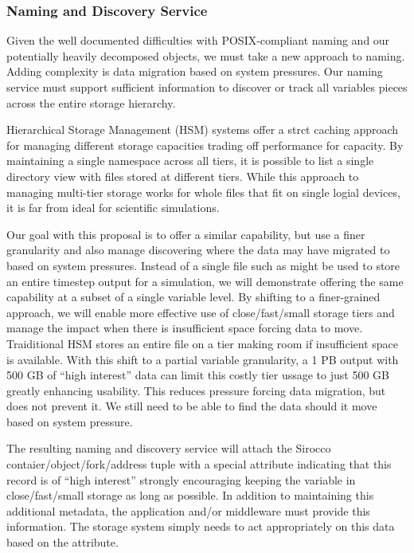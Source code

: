\subsubsection{Naming and Discovery Service}

Given the well documented difficulties with POSIX-compliant naming and our
potentially heavily decomposed objects, we must take a new approach to naming.
Adding complexity is data migration based on system pressures. Our naming
service must support sufficient information to discover or track all variables
pieces across the entire storage hierarchy.

Hierarchical Storage Management (HSM) systems offer a strct caching approach
for managing different storage capacities trading off performance for capacity.
By maintaining a single namespace across all tiers, it is possible to list a
single directory view with files stored at different tiers. While this approach
to managing multi-tier storage works for whole files that fit on single logial
devices, it is far from ideal for scientific simulations.

Our goal with this proposal is to offer a similar capability, but use a finer
granularity and also manage discovering where the data may have migrated to
based on system pressures. Instead of a single file such as might be used to
store an entire timestep output for a simulation, we will demonstrate offering
the same capability at a subset of a single variable level. By shifting to a
finer-grained approach, we will enable more effective use of close/fast/small
storage tiers and manage the impact when there is insufficient space forcing
data to move. Traiditional HSM stores an entire file on a tier making room if
insufficient space is available. With this shift to a partial variable
granularity, a 1 PB output with 500 GB of ``high interest'' data can limit this
costly tier ussage to just 500 GB greatly enhancing usability. This reduces
pressure forcing data migration, but does not prevent it. We still need to be
able to find the data should it move based on system pressure.

The resulting naming and discovery service will attach the Sirocco
contaier/object/fork/address tuple with a special attribute indicating that
this record is of ``high interest'' strongly encouraging keeping the variable
in close/fast/small storage as long as possible. In addition to maintaining
this additional metadata, the application and/or middleware must provide this
information. The storage system simply needs to act appropriately on this data
based on the attribute.

